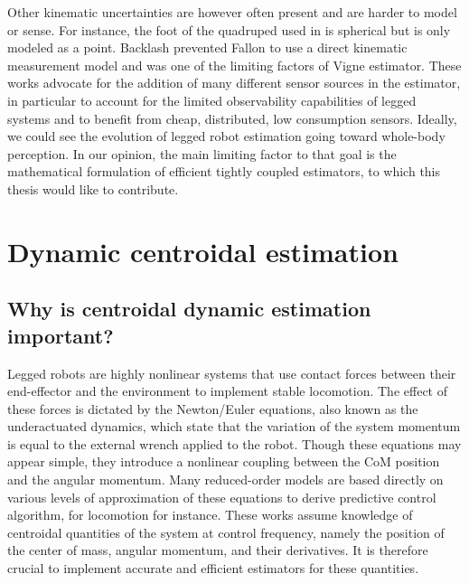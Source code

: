 Other kinematic uncertainties are however often present and are harder to model or sense. For instance, the foot of the quadruped used in 
\cite{bloesch2013state} is spherical but is only modeled as a point. Backlash prevented Fallon \cite{fallon2014drift} to use a direct kinematic 
measurement model and was one of the limiting factors of Vigne \cite{vigne2018estimation} estimator.
These works advocate for the addition of many different sensor sources in the estimator, in particular to account for the limited observability
capabilities of legged systems and to benefit from cheap, distributed, low consumption sensors. Ideally, we could see the evolution of legged
robot estimation going toward whole-body perception. In our opinion, the main limiting factor to that goal is the mathematical formulation of efficient tightly
coupled estimators, to which this thesis would like to contribute.  


\section{Dynamic centroidal estimation}
%
\subsection{Why is centroidal dynamic estimation important?}
Legged robots are highly nonlinear systems that use contact forces between their end-effector and the environment to implement stable locomotion. 
The effect of these forces is dictated by the Newton/Euler equations, also known as the underactuated dynamics, which state that the variation of the 
system momentum is equal to the external wrench applied to the robot. Though these equations may appear simple, they introduce a nonlinear coupling 
between the CoM position and the angular momentum. Many reduced-order models are based directly on 
various levels of approximation of these equations \cite{kajita20013d, wieber2006trajectory, carpentier2016versatile} to derive predictive
control algorithm, for locomotion for instance. These works assume knowledge of centroidal quantities of the system at control frequency, 
namely the position of the center of mass, angular momentum, and their derivatives. 
It is therefore crucial to implement accurate and efficient estimators for these quantities.

